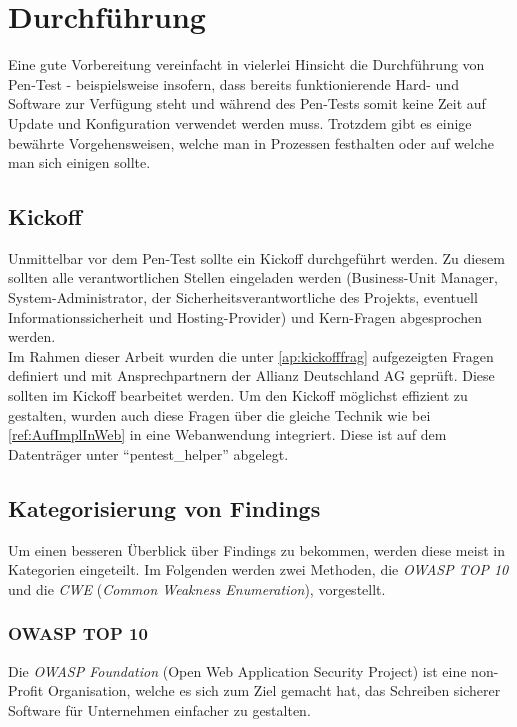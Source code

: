 \section{Durchführung}
Eine gute Vorbereitung vereinfacht in vielerlei Hinsicht die Durchführung von Pen-Test - beispielsweise insofern, dass bereits funktionierende Hard- und Software zur Verfügung steht und während des Pen-Tests somit keine Zeit auf Update und Konfiguration verwendet werden muss. Trotzdem gibt es einige bewährte Vorgehensweisen, welche man in Prozessen festhalten oder auf welche man sich einigen sollte. 

\subsection{Kickoff}\label{ref:PenProzKickoffWeb}
Unmittelbar vor dem Pen-Test sollte ein Kickoff durchgeführt werden. Zu diesem sollten alle verantwortlichen Stellen eingeladen werden (Business-Unit Manager, System-Administrator, der Sicherheitsverantwortliche des Projekts, eventuell Informationssicherheit und Hosting-Provider) und Kern-Fragen abgesprochen werden.\\
	
	Im Rahmen dieser Arbeit wurden die unter \ref{ap:kickofffrag} aufgezeigten Fragen definiert und mit Ansprechpartnern der Allianz Deutschland AG geprüft. Diese sollten im Kickoff bearbeitet werden. Um den Kickoff möglichst effizient zu gestalten, wurden auch diese Fragen über die gleiche Technik wie bei \ref{ref:AufImplInWeb} in eine Webanwendung integriert. Diese ist auf dem Datenträger unter "`pentest\_helper"' abgelegt.
			
	\subsection{Kategorisierung von Findings}
	Um einen besseren Überblick über Findings zu bekommen, werden diese meist in Kategorien eingeteilt. Im Folgenden werden zwei Methoden, die \textit{OWASP TOP 10} und die \textit{CWE} (\textit{Common Weakness Enumeration}), vorgestellt.
	
		\subsubsection{OWASP TOP 10}
		Die \textit{OWASP Foundation} (Open Web Application Security Project) ist eine non-Profit Organisation, welche es sich zum Ziel gemacht hat, das Schreiben sicherer Software für Unternehmen einfacher zu gestalten.\\
		
